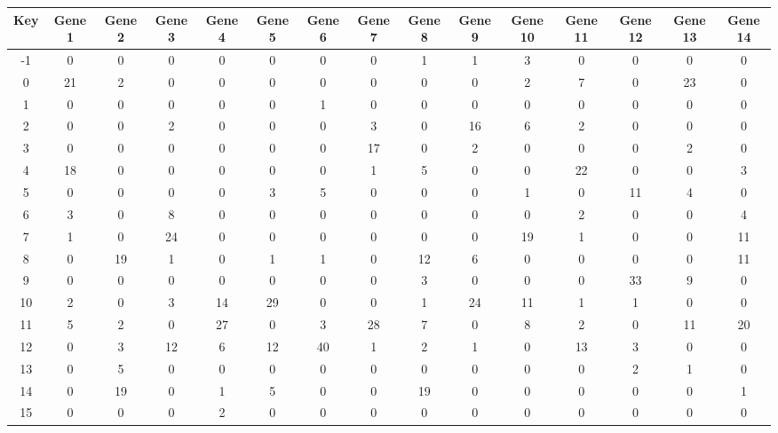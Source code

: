 \begin{tabular}{|c|c|c|c|c|c|c|c|c|c|c|c|c|c|c|}
\hline
Key & Gene 1 & Gene 2 & Gene 3 & Gene 4 & Gene 5 & Gene 6 & Gene 7 & Gene 8 & Gene 9 & Gene 10 & Gene 11 & Gene 12 & Gene 13 & Gene 14 \\
\hline
-1 & 0 & 0 & 0 & 0 & 0 & 0 & 0 & 1 & 1 & 3 & 0 & 0 & 0 & 0 \\
0 & 21 & 2 & 0 & 0 & 0 & 0 & 0 & 0 & 0 & 2 & 7 & 0 & 23 & 0 \\
1 & 0 & 0 & 0 & 0 & 0 & 1 & 0 & 0 & 0 & 0 & 0 & 0 & 0 & 0 \\
2 & 0 & 0 & 2 & 0 & 0 & 0 & 3 & 0 & 16 & 6 & 2 & 0 & 0 & 0 \\
3 & 0 & 0 & 0 & 0 & 0 & 0 & 17 & 0 & 2 & 0 & 0 & 0 & 2 & 0 \\
4 & 18 & 0 & 0 & 0 & 0 & 0 & 1 & 5 & 0 & 0 & 22 & 0 & 0 & 3 \\
5 & 0 & 0 & 0 & 0 & 3 & 5 & 0 & 0 & 0 & 1 & 0 & 11 & 4 & 0 \\
6 & 3 & 0 & 8 & 0 & 0 & 0 & 0 & 0 & 0 & 0 & 2 & 0 & 0 & 4 \\
7 & 1 & 0 & 24 & 0 & 0 & 0 & 0 & 0 & 0 & 19 & 1 & 0 & 0 & 11 \\
8 & 0 & 19 & 1 & 0 & 1 & 1 & 0 & 12 & 6 & 0 & 0 & 0 & 0 & 11 \\
9 & 0 & 0 & 0 & 0 & 0 & 0 & 0 & 3 & 0 & 0 & 0 & 33 & 9 & 0 \\
10 & 2 & 0 & 3 & 14 & 29 & 0 & 0 & 1 & 24 & 11 & 1 & 1 & 0 & 0 \\
11 & 5 & 2 & 0 & 27 & 0 & 3 & 28 & 7 & 0 & 8 & 2 & 0 & 11 & 20 \\
12 & 0 & 3 & 12 & 6 & 12 & 40 & 1 & 2 & 1 & 0 & 13 & 3 & 0 & 0 \\
13 & 0 & 5 & 0 & 0 & 0 & 0 & 0 & 0 & 0 & 0 & 0 & 2 & 1 & 0 \\
14 & 0 & 19 & 0 & 1 & 5 & 0 & 0 & 19 & 0 & 0 & 0 & 0 & 0 & 1 \\
15 & 0 & 0 & 0 & 2 & 0 & 0 & 0 & 0 & 0 & 0 & 0 & 0 & 0 & 0 \\
\hline
\end{tabular}